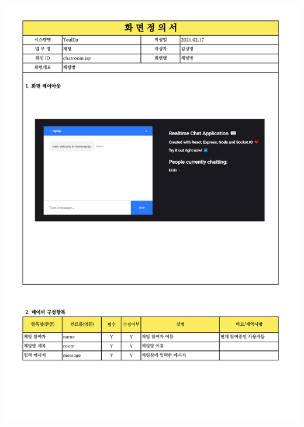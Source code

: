{{{{{{{{{{{{{{{{{{{{{{{{{{{{{{{{{{{{{{{{{{{{{{{{{{{{{{{{{{{{{{{{{{{{{{{{{{{{{{{{{{{{{{{\includegraphics[width=20cm]{./Figure/Design/Display/chat/chat_002.pdf} \\
}}}}}}}}}}}}}}}}}}}}}}}}}}}}}}}}}}}}}}}}}}}}}}}}}}}}}}}}}}}}}}}}}}}}}}}}}}}}}}}}}}}}}}}
